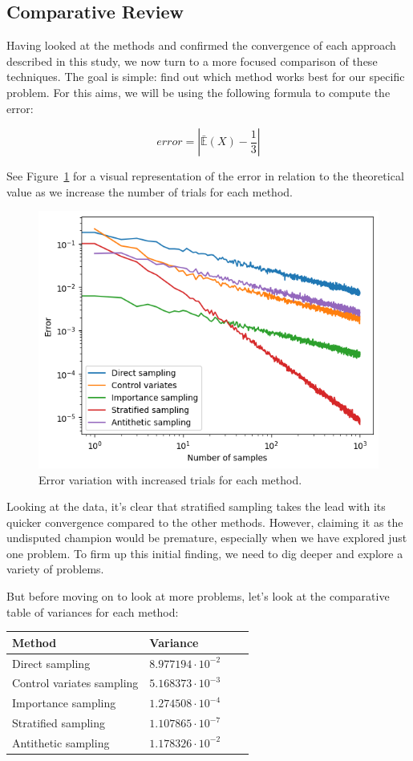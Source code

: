 \documentclass{report}
\begin{document}
\subsection{Comparative Review}
\label{sec:comparative_review}

Having looked at the methods and confirmed the convergence of each approach described in this study, we now turn to a more focused comparison of these techniques. The goal is simple: find out which method works best for our specific problem. For this aims, we will be using the following formula to compute the error:

\begin{equation*} error = | \bar{\mathbb{E}}(X) - \frac{1}{3} | \end{equation*}

See Figure~\ref{fig:comparisonvariancereduction} for a visual representation of the error in relation to the theoretical value as we increase the number of trials for each method.

\begin{figure}[H]
\centering
\includegraphics[width=0.5\linewidth]{./Figures/VarianceReduction/comparison.png}
\caption{Error variation with increased trials for each method.}
\label{fig:comparisonvariancereduction}
\end{figure}

Looking at the data, it’s clear that stratified sampling takes the lead with its quicker convergence compared to the other methods. However, claiming it as the undisputed champion would be premature, especially when we have explored just one problem. To firm up this initial finding, we need to dig deeper and explore a variety of problems.

But before moving on to look at more problems, let's look at the comparative table of variances for each method:

\begin{center}
	\begin{tabular}{ |p{5cm}||p{3cm}|p{3cm}|p{3cm}|  }
		\hline
		Method & Variance \\
		\hline
		\hline
		Direct sampling   			& \(8.977194 \cdot 10^{-2}\) \\
		\hline
		Control variates sampling 	& \(5.168373 \cdot 10^{-3}\) \\
		\hline
		Importance sampling      	& \(1.274508 \cdot 10^{-4}\) \\
		\hline
		Stratified sampling       	& \(1.107865 \cdot 10^{-7}\) \\
		\hline
		Antithetic sampling      	& \(1.178326 \cdot 10^{-2}\) \\
		\hline
	\end{tabular}
\end{center}
\end{document}
